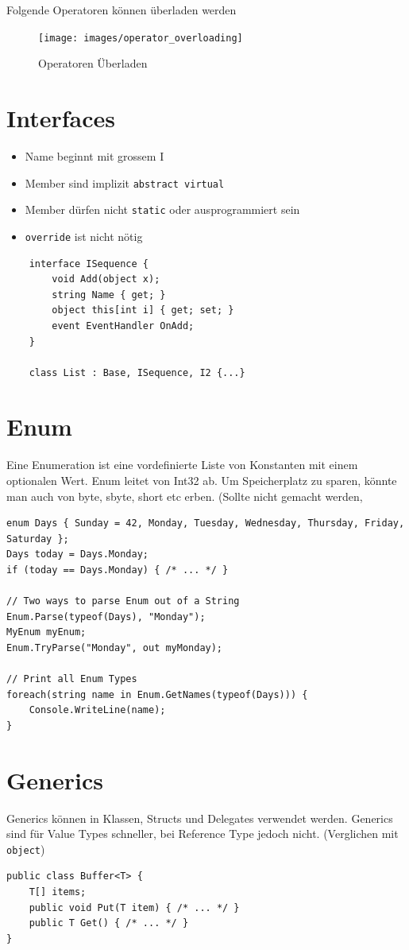 Folgende Operatoren können überladen werden
\begin{figure}[h!]
\centering
\texttt{[image: images/operator\_overloading]}
\caption{Operatoren Überladen}
\label{fig:operatoroverloading}
\end{figure}


\section{Interfaces}
\begin{itemize}
	\item Name beginnt mit grossem I	
	\item Member sind implizit \lstinline[language=C]|abstract virtual|
	\item Member dürfen nicht \lstinline|static| oder ausprogrammiert sein 
	\item \lstinline|override| ist nicht nötig
\end{itemize}
\begin{lstlisting}
	interface ISequence {
		void Add(object x);
		string Name { get; }
		object this[int i] { get; set; }
		event EventHandler OnAdd;
	}
	
	class List : Base, ISequence, I2 {...}
\end{lstlisting}

\section{Enum}
Eine Enumeration ist eine vordefinierte Liste von Konstanten mit einem optionalen Wert. Enum leitet von Int32 ab. Um Speicherplatz zu sparen, könnte man auch von byte, sbyte, short etc erben. (Sollte nicht gemacht werden, 
\begin{lstlisting}
enum Days { Sunday = 42, Monday, Tuesday, Wednesday, Thursday, Friday, Saturday };
Days today = Days.Monday;
if (today == Days.Monday) { /* ... */ }

// Two ways to parse Enum out of a String
Enum.Parse(typeof(Days), "Monday");
MyEnum myEnum;
Enum.TryParse("Monday", out myMonday);

// Print all Enum Types
foreach(string name in Enum.GetNames(typeof(Days))) {
	Console.WriteLine(name);
}
\end{lstlisting}

\section{Generics}
Generics können in Klassen, Structs und Delegates verwendet werden. Generics sind für Value Types schneller, bei Reference Type jedoch nicht. (Verglichen mit \lstinline|object|) 
\begin{lstlisting}
public class Buffer<T> {
	T[] items;
	public void Put(T item) { /* ... */ }
	public T Get() { /* ... */ }
}
\end{lstlisting}

